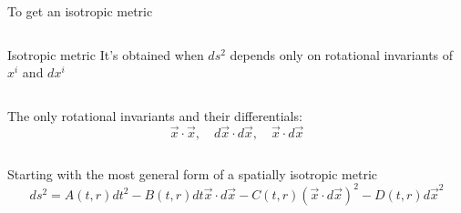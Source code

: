 \documentclass[xcolor=dvipsnames]{beamer}
\begin{document}
\begin{frame}{To get an isotropic metric}
\begin{multicols}{2}
    \begin{column}{0.46\textwidth}
    \begin{block}{\centering Isotropic metric}
    \centering
    It's obtained when $ds^2$ depends only on rotational invariants of $x^i$ and $dx^i$
    \end{block}
    \end{column}
    
    \begin{column}{0.48\textwidth}
    \begin{exampleblock}
    {}\centering The only rotational invariants and their differentials:
    $$\vec{x} \cdot \vec{x}, \quad d \vec{x} \cdot d \vec{x}, \quad \vec{x} \cdot d \vec{x}$$
    \end{exampleblock}
    \end{column}
\end{multicols}
    
    \begin{block}
    {} Starting with the most general form of a spatially isotropic metric
    $$ds^2=A(t,r)dt^2-B(t,r)dt\Vec{x}\cdot d\Vec{x} -C(t,r)(\Vec{x}\cdot d\Vec{x})^2-D(t,r)d\Vec{x}^2$$
    \end{block}
\end{frame}
\end{document}
